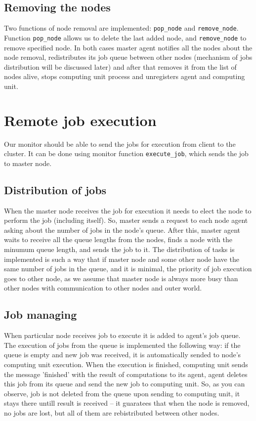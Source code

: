 \documentclass[12pt]{article}
\begin{document}
\subsection{Removing the nodes}

Two functions of node removal are implemented: \texttt{pop\_node} and \texttt{remove\_node}. Function \texttt{pop\_node} allows us to delete the last added node, and \texttt{remove\_node} to remove specified node. In both cases master agent notifies all the nodes about the node removal, redistributes its job queue between other nodes (mechanism of jobs distribution will be discussed later) and after that removes it from the list of nodes alive, stops computing unit process and unregisters agent and computing unit.

\section{Remote job execution}

Our monitor should be able to send the jobs for execution from client to the cluster. It can be done using monitor function \texttt{execute\_job}, which sends the job to master node.

\subsection{Distribution of jobs}

When the master node receives the job for execution it needs to elect the node to perform the job (including itself). So, master sends a request to each node agent asking about the number of jobs in the node's queue. After this, master agent waits to receive all the queue lengths from the nodes, finds a node with the minumum queue length, and sends the job to it. The distribution of tasks is implemented is such a way that if master node and some other node have the same number of jobs in the queue, and it is minimal, the priority of job execution goes to other node, as we assume that master node is always more busy than other nodes with communication to other nodes and outer world.

\subsection{Job managing}

When particular node receives job to execute it is added to agent's job queue. The execution of jobs from the queue is implemented the following way: if the queue is empty and new job was received, it is automatically sended to node's computing unit execution. When the execution is finished, computing unit sends the message 'finished' with the result of computations to its agent, agent deletes this job from its queue and send the new job to computing unit. So, as you can observe, job is not deleted from the queue upon sending to computing unit, it stays there untill result is received -- it guaratees that when the node is removed, no jobs are lost, but all of them are rebistributed between other nodes.
\end{document}

